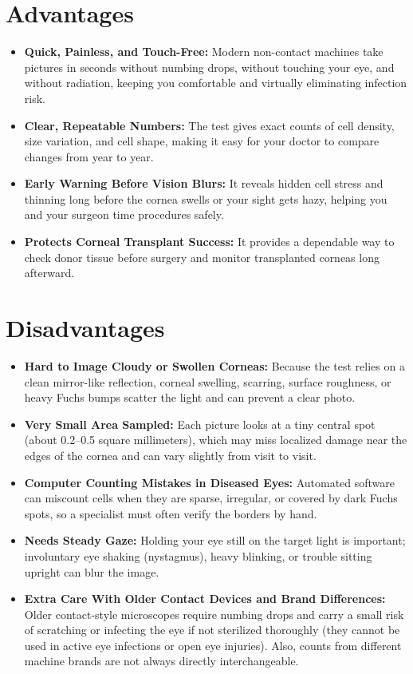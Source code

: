 \section{Advantages}

\begin{itemize}
    \item \textbf{Quick, Painless, and Touch-Free:} Modern non-contact machines take pictures in seconds without numbing drops, without touching your eye, and without radiation, keeping you comfortable and virtually eliminating infection risk.
    \item \textbf{Clear, Repeatable Numbers:} The test gives exact counts of cell density, size variation, and cell shape, making it easy for your doctor to compare changes from year to year.
    \item \textbf{Early Warning Before Vision Blurs:} It reveals hidden cell stress and thinning long before the cornea swells or your sight gets hazy, helping you and your surgeon time procedures safely.
    \item \textbf{Protects Corneal Transplant Success:} It provides a dependable way to check donor tissue before surgery and monitor transplanted corneas long afterward.
\end{itemize}

\section{Disadvantages}

\begin{itemize}
    \item \textbf{Hard to Image Cloudy or Swollen Corneas:} Because the test relies on a clean mirror-like reflection, corneal swelling, scarring, surface roughness, or heavy Fuchs bumps scatter the light and can prevent a clear photo.
    \item \textbf{Very Small Area Sampled:} Each picture looks at a tiny central spot (about 0.2--0.5 square millimeters), which may miss localized damage near the edges of the cornea and can vary slightly from visit to visit.
    \item \textbf{Computer Counting Mistakes in Diseased Eyes:} Automated software can miscount cells when they are sparse, irregular, or covered by dark Fuchs spots, so a specialist must often verify the borders by hand.
    \item \textbf{Needs Steady Gaze:} Holding your eye still on the target light is important; involuntary eye shaking (nystagmus), heavy blinking, or trouble sitting upright can blur the image.
    \item \textbf{Extra Care With Older Contact Devices and Brand Differences:} Older contact-style microscopes require numbing drops and carry a small risk of scratching or infecting the eye if not sterilized thoroughly (they cannot be used in active eye infections or open eye injuries). Also, counts from different machine brands are not always directly interchangeable.
\end{itemize}

